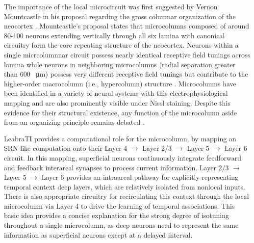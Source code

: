 \documentclass[dwyatte_dissertation.tex]{subfiles}
\begin{document}
The importance of the local microcircuit was first suggested by Vernon Mountcastle in his proposal regarding the gross columnar organization of the neocortex \cite[see][for a comprehensive review]{Mountcastle97}. Mountcastle's proposal states that microcolumns composed of around 80-100 neurons extending vertically through all six lamina with canonical circuitry form the core repeating structure of the neocortex. Neurons within a single micrcolumnnar circuit possess nearly identical receptive field tunings across lamina while neurons in neighboring microcolumns (radial separation greater than 600 \SI{}{\micro\meter}) possess very different receptive field tunings but contribute to the higher-order macrocolumn (i.e., hypercolumn) structure \cite{HubelWiesel77,Jones00}. Microcolumns have been identified in a variety of neural systems with this electrophysiological mapping and are also prominently visible under Nissl staining. Despite this evidence for their structural existence, any function of the microcolumn aside from an organizing principle remains debated \cite{BuxhoevedenCasanova02,HortonAdams05}.

LeabraTI provides a computational role for the microcolumn, by mapping an SRN-like computation onto their Layer 4 $\rightarrow$ Layer 2/3 $\rightarrow$ Layer 5 $\rightarrow$ Layer 6 circuit. In this mapping, superficial neurons continuously integrate feedforward and feedback interareal synapses to process current information. Layer 2/3 $\rightarrow$ Layer 5 $\rightarrow$ Layer 6 provides an intraareal pathway for explicitly representing temporal context deep layers, which are relatively isolated from nonlocal inputs. There is also appropriate circuitry for recirculating this context through the local microcolumn via Layer 4 to drive the learning of temporal associations. This basic idea provides a concise explanation for the strong degree of isotuning throughout a single microcolumn, as deep neurons need to represent the same information as superficial neurons except at a delayed interval.
\end{document}

